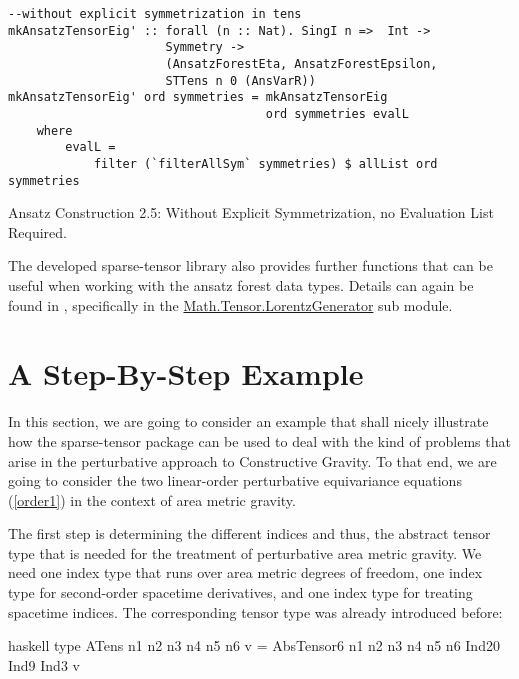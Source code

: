 \begin{listing}[hbt!]
\begin{verbatim}
--without explicit symmetrization in tens
mkAnsatzTensorEig' :: forall (n :: Nat). SingI n =>  Int ->
                      Symmetry ->
                      (AnsatzForestEta, AnsatzForestEpsilon,
                      STTens n 0 (AnsVarR))
mkAnsatzTensorEig' ord symmetries = mkAnsatzTensorEig
                                    ord symmetries evalL
    where
        evalL =
            filter (`filterAllSym` symmetries) $ allList ord symmetries
\end{verbatim} 
\caption{Ansatz Construction 2.5: Without Explicit Symmetrization, no Evaluation List Required.}\label{mkAnsatzEig2'}
\end{listing}

The developed sparse-tensor library also provides further functions that can be useful when working with the ansatz forest data types. Details can again be found in \cite{sparse-tensor}, specifically in the \href{http://hackage.haskell.org/package/sparse-tensor-0.2.1.1/docs/Math-Tensor-LorentzGenerator.html}{Math.Tensor.LorentzGenerator} sub module. 

\section{A Step-By-Step Example}
In this section, we are going to consider an example that shall nicely illustrate how the sparse-tensor package can be used to deal with the kind of problems that arise in the perturbative approach to Constructive Gravity. To that end, we are going to consider the two linear-order perturbative equivariance equations (\ref{order1}) in the context of area metric gravity. 

The first step is determining the different indices and thus, the abstract tensor type that is needed for the treatment of perturbative area metric gravity. 
We need one index type that runs over area metric degrees of freedom, one index type for second-order spacetime derivatives, and one index type for treating spacetime indices. The corresponding tensor type was already introduced before:

\begin{center}
\begin{cminted}{haskell}
type ATens n1 n2 n3 n4 n5 n6 v = 
     AbsTensor6 n1 n2 n3 n4 n5 n6 Ind20 Ind9 Ind3 v
\end{cminted}
\end{center}

